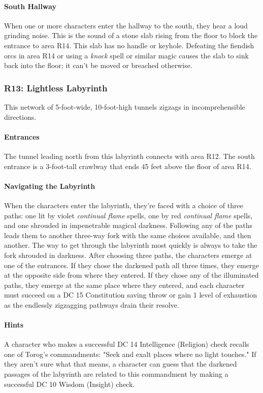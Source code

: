 \documentclass[10pt,a4,twoside,twocolumn,openany,nodeprecatedcode]{dndbook}
\begin{document}
\paragraph{South Hallway}
When one or more characters enter the hallway to the south, they hear a loud grinding noise. This is the sound of a stone slab rising from the floor to block the entrance to area R14. This slab has no handle or keyhole. Defeating the fiendish orcs in area R14 or using a \textit{knock} spell or similar magic causes the slab to sink back into the floor; it can't be moved or breached otherwise.
\subsubsection{R13: Lightless Labyrinth}
This network of 5-foot-wide, 10-foot-high tunnels zigzags in incomprehensible directions.
\paragraph{Entrances}
The tunnel leading north from this labyrinth connects with area R12. The south entrance is a 3-foot-tall crawlway that ends 45 feet above the floor of area R14.
\paragraph{Navigating the Labyrinth}
When the characters enter the labyrinth, they're faced with a choice of three paths: one lit by violet \textit{continual flame} spells, one by red \textit{continual flame} spells, and one shrouded in impenetrable magical darkness. Following any of the paths leads them to another three-way fork with the same choices available, and then another. The way to get through the labyrinth most quickly is always to take the fork shrouded in darkness.
After choosing three paths, the characters emerge at one of the entrances. If they chose the darkened path all three times, they emerge at the opposite side from where they entered. If they chose any of the illuminated paths, they emerge at the same place where they entered, and each character must succeed on a DC 15 Constitution saving throw or gain 1 level of exhaustion as the endlessly zigzagging pathways drain their resolve.
\paragraph{Hints}
A character who makes a successful DC 14 Intelligence (Religion) check recalls one of Torog's commandments: "Seek and exalt places where no light touches." If they aren't sure what that means, a character can guess that the darkened passages of the labyrinth are related to this commandment by making a successful DC 10 Wisdom (Insight) check.
\end{document}
